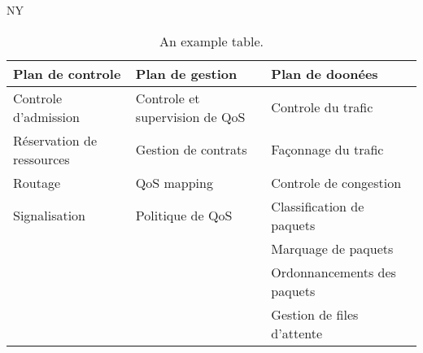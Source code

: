 
\ac{NY}


\begin{table}[h!]
\scriptsize
	\begin{tabulary}{\textwidth}{L|L|L}
		\textbf{Plan de controle}   & \textbf{Plan de gestion}   & 	\textbf{Plan de doonées}  \\\hline
	Controle d'admission      & Controle et supervision de QoS & Controle du trafic         \\
	Réservation de ressources & Gestion de contrats            & Façonnage du trafic        \\
	Routage                   & QoS mapping                    & Controle de congestion     \\
	Signalisation             & Politique de QoS               & Classification de paquets  \\
	\                         &                                & Marquage de paquets        \\
	\                         &                                & Ordonnancements des paquets\\
	\                         &                                & Gestion de files d'attente \\
	\end{tabulary}
	\caption{\label{tab:qos} An example table.}
\end{table}

%	


